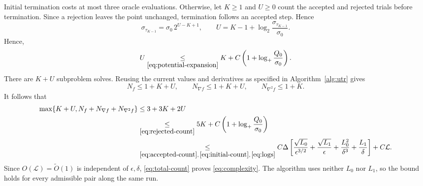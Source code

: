 Initial termination costs at most three oracle evaluations.
Otherwise, let $K\ge1$ and $U\ge0$ count the accepted and rejected
trials before termination. Since a rejection leaves the point
unchanged, termination follows an accepted step. Hence
\[
 \sigma_{\tau_{K-1}}=\sigma_0\,2^{U-K+1},
 \qquad
 U=K-1+\log_2\frac{\sigma_{\tau_{K-1}}}{\sigma_0}.
\]
Hence,
\begin{equation}\label{eq:rejected-count}
 U\underset{\eqref{eq:potential-expansion}}{\le}
       K+C\left(1+\log_+\frac{Q_0}{\sigma_0}\right).
\end{equation}
There are $K+U$ subproblem solves. Reusing the current values and
derivatives as specified in Algorithm~\ref{alg:utr} gives
\[
 N_f\le1+K+U,\qquad
 N_{\nabla f}\le1+K+U,\qquad
 N_{\nabla^2 f}\le1+K.
\]
It follows that
\begin{align}
 \max\{K+U,N_f+N_{\nabla f}+N_{\nabla^2f}\}
 &\le3+3K+2U\nonumber\\
 &\underset{\eqref{eq:rejected-count}}{\le}5K+C\left(1+\log_+\frac{Q_0}{\sigma_0}\right)\nonumber\\
 &\underset{\eqref{eq:accepted-count},\,\eqref{eq:initial-count},\,\eqref{eq:logs}}{\le}C\Delta\left[
 \frac{\sqrt{L_0}}{\epsilon^{3/2}}
 +\frac{\sqrt{L_1}}{\epsilon}
 +\frac{L_0^2}{\delta^3}
 +\frac{L_1}{\delta}\right]+C\mathcal L.
 \label{eq:total-count}
\end{align}
Since $O(\mathcal L)=\widetilde O(1)$ is independent of
$\epsilon,\delta$, \eqref{eq:total-count} proves
\eqref{eq:complexity}. The algorithm uses neither $L_0$ nor $L_1$,
so the bound holds for every admissible pair along the same run.
